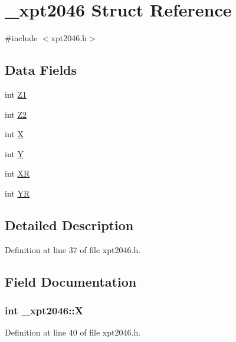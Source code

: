 \hypertarget{struct__xpt2046}{}\section{\+\_\+xpt2046 Struct Reference}
\label{struct__xpt2046}


{\ttfamily \#include $<$xpt2046.\+h$>$}

\subsection*{Data Fields}
\begin{DoxyCompactItemize}
\item 
int \hyperlink{struct__xpt2046_a3d4ffe11b35c91513c5c90b0b1d59f44}{Z1}
\item 
int \hyperlink{struct__xpt2046_af0cfbd929b6b3ae00d926aed6bd2dbcf}{Z2}
\item 
int \hyperlink{struct__xpt2046_a0ec6de4636a5f747e363186ff347039f}{X}
\item 
int \hyperlink{struct__xpt2046_a246ecf319439bdb35f405238c93a0868}{Y}
\item 
int \hyperlink{struct__xpt2046_a84ee789fdab925bb14ea18705bb47bdc}{XR}
\item 
int \hyperlink{struct__xpt2046_a2c03aa55cd5446e4d44c9de8c1c3ca26}{YR}
\end{DoxyCompactItemize}


\subsection{Detailed Description}


Definition at line 37 of file xpt2046.\+h.



\subsection{Field Documentation}
\subsubsection[{\texorpdfstring{X}{X}}]{\setlength{\rightskip}{0pt plus 5cm}int \+\_\+xpt2046\+::X}\hypertarget{struct__xpt2046_a0ec6de4636a5f747e363186ff347039f}{}\label{struct__xpt2046_a0ec6de4636a5f747e363186ff347039f}


Definition at line 40 of file xpt2046.\+h.



